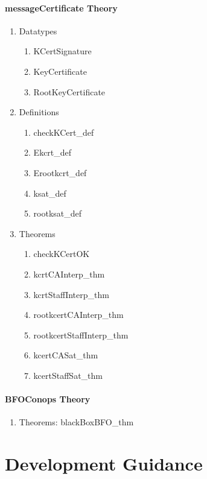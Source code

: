 \documentclass[10pt,twoside]{article}
\begin{document}
\paragraph{messageCertificate Theory}

\begin{enumerate}
\item Datatypes
  \begin{enumerate}[{a.}]
  \item KCertSignature
  \item KeyCertificate
  \item RootKeyCertificate
  \end{enumerate}

\item Definitions
  \begin{enumerate}[{a.}]
  \item checkKCert\_def
  \item Ekcrt\_def
  \item Erootkcrt\_def
  \item ksat\_def
  \item rootksat\_def
  \end{enumerate}

\item Theorems
  \begin{enumerate}[{a.}]
  \item checkKCertOK
  \item kcrtCAInterp\_thm
  \item kcrtStaffInterp\_thm
  \item rootkcertCAInterp\_thm
  \item rootkcertStaffInterp\_thm
  \item kcertCASat\_thm
  \item kcertStaffSat\_thm
  \end{enumerate}

\end{enumerate}

\paragraph{BFOConops Theory}

\begin{enumerate}
\item Theorems: blackBoxBFO\_thm

\end{enumerate}

\section{Development Guidance}
\label{sec:guidance}
\end{document}
